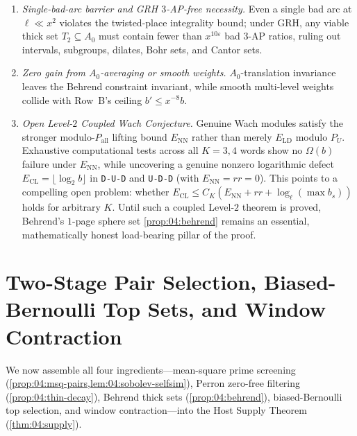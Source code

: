 \begin{remark}
\begin{enumerate}[label=\textup{(\arabic*)}]
\item \emph{Single-bad-arc barrier and GRH $3$-AP-free necessity.} Even a single bad arc at $\ell \ll x^2$ violates the twisted-place integrality bound; under GRH, any viable thick set $T_2 \subseteq A_0$ must contain fewer than $x^{10\varepsilon}$ bad $3$-AP ratios, ruling out intervals, subgroups, dilates, Bohr sets, and Cantor sets.
\item \emph{Zero gain from $A_0$-averaging or smooth weights.} $A_0$-translation invariance leaves the Behrend constraint invariant, while smooth multi-level weights collide with Row~B's ceiling $b' \le x^{-8} b$.
\item \emph{Open Level-$2$ Coupled Wach Conjecture.} Genuine Wach modules satisfy the stronger modulo-$P_{\mathrm{all}}$ lifting bound $E_{\mathrm{NN}}$ rather than merely $E_{\mathrm{LD}}$ modulo $P_U$. Exhaustive computational tests across all $K = 3, 4$ words show no $\Omega(b)$ failure under $E_{\mathrm{NN}}$, while uncovering a genuine nonzero logarithmic defect $E_{\mathrm{CL}} = \lfloor \log_2 b \rfloor$ in \texttt{D-U-D} and \texttt{U-D-D} (with $E_{\mathrm{NN}} = rr = 0$). This points to a compelling open problem: whether $E_{\mathrm{CL}} \le C_K(E_{\mathrm{NN}} + rr + \log_\ell(\max b_s))$ holds for arbitrary $K$. Until such a coupled Level-$2$ theorem is proved, Behrend's $1$-page sphere set \cref{prop:04:behrend} remains an essential, mathematically honest load-bearing pillar of the proof.
\end{enumerate}
\end{remark}

\section{Two-Stage Pair Selection, Biased-Bernoulli Top Sets, and Window Contraction}
\label{sec:04:supply}

We now assemble all four ingredients—mean-square prime screening (\cref{prop:04:msq-pairs,lem:04:sobolev-selfsim}), Perron zero-free filtering (\cref{prop:04:thin-decay}), Behrend thick sets (\cref{prop:04:behrend}), biased-Bernoulli top selection, and window contraction—into the Host Supply Theorem (\cref{thm:04:supply}).


